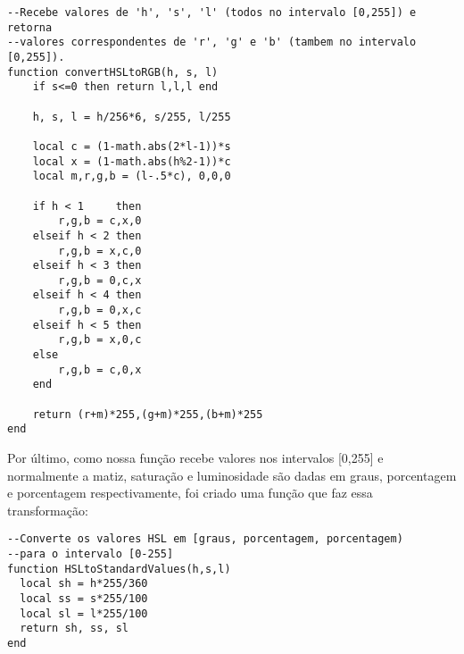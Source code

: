 \begin{lstlisting}[language={[5.0]lua}]
--Recebe valores de 'h', 's', 'l' (todos no intervalo [0,255]) e retorna
--valores correspondentes de 'r', 'g' e 'b' (tambem no intervalo [0,255]).
function convertHSLtoRGB(h, s, l)
	if s<=0 then return l,l,l end

	h, s, l = h/256*6, s/255, l/255

	local c = (1-math.abs(2*l-1))*s
	local x = (1-math.abs(h%2-1))*c
	local m,r,g,b = (l-.5*c), 0,0,0

	if h < 1     then
		r,g,b = c,x,0
	elseif h < 2 then
	 	r,g,b = x,c,0
	elseif h < 3 then
	 	r,g,b = 0,c,x
	elseif h < 4 then
	 	r,g,b = 0,x,c
	elseif h < 5 then
	 	r,g,b = x,0,c
	else
	 	r,g,b = c,0,x
	end

	return (r+m)*255,(g+m)*255,(b+m)*255
end
\end{lstlisting}

Por último, como nossa função recebe valores nos intervalos [0,255] e normalmente a matiz, saturação e luminosidade são dadas em graus, porcentagem e porcentagem respectivamente, foi criado uma função que faz essa transformação:

\begin{lstlisting}[language={[5.0]lua}]
--Converte os valores HSL em [graus, porcentagem, porcentagem)
--para o intervalo [0-255]
function HSLtoStandardValues(h,s,l)
  local sh = h*255/360
  local ss = s*255/100
  local sl = l*255/100
  return sh, ss, sl
end
\end{lstlisting}
